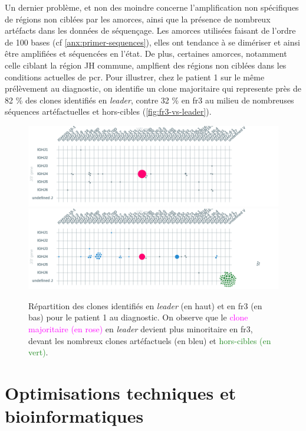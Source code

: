 Un dernier problème, et non des moindre concerne l'amplification non spécifiques de régions non ciblées par les amorces, 
ainsi que la présence de nombreux artéfacts dans les données de séquençage. Les amorces utilisées faisant de l'ordre de 100 bases 
(cf \autoref{anx:primer-sequences}), elles ont tendance à se dimériser et ainsi être amplifiées et séquencées en l'état. 
De plus, certaines amorces, notamment celle ciblant la région JH commune, amplfient des régions non ciblées dans 
les conditions actuelles de \gls{pcr}. Pour illustrer, chez le patient 1 sur le même prélèvement au diagnostic, on identifie 
un clone majoritaire qui represente près de 82 \% des clones identifiés en \textit{leader}, contre 32 \% en \gls{fr}3 au milieu 
de nombreuses séquences artéfactuelles et hors-cibles (\autoref{fig:fr3-vs-leader}).

\begin{figure}[H]
    \centering
    \includegraphics[width=1\textwidth]{images/diag_leader.png}
    \vspace{0.5cm}
    \includegraphics[width=1\textwidth]{images/diag_fr3.png}
    \caption{
        Répartition des clones identifiés en \textit{leader} (en haut) et en \gls{fr}3 (en bas) 
        pour le patient 1 au diagnostic. On observe que le \textcolor{Magenta}{clone majoritaire (en rose)} 
        en \textit{leader} devient plus minoritaire en \gls{fr}3, devant les \textcolor{ProcessBlue}{nombreux clones artéfactuels (en bleu)}  
        et \textcolor{ForestGreen}{hors-cibles (en vert)}.
    }
    \label{fig:fr3-vs-leader}
\end{figure}

\section{Optimisations techniques et bioinformatiques}

